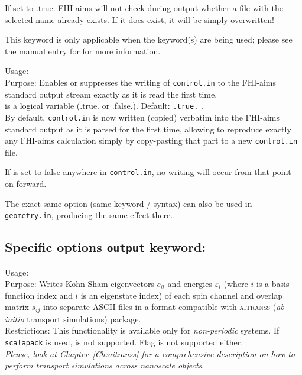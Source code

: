 If set to .true. FHI-aims will not check during output whether a file with the
selected name already exists. If it does exist, it will be simply overwritten!

This keyword is only applicable when the
  keyword(s) are being used; please see
the manual entry for   for more
information.

{
  \noindent
  Usage:   \\[1.0ex]
  Purpose: Enables or suppresses the writing of \texttt{control.in} to
  the FHI-aims standard output stream exactly as it is read the first
  time. \\[1.0ex]
   is a logical variable (.true. or .false.). Default: \texttt{.true.} . \\
}
By default, \texttt{control.in} is now written (copied) verbatim into
the FHI-aims standard output as it is parsed for the first time,
allowing to reproduce exactly any FHI-aims calculation simply by
copy-pasting that part to a new \texttt{control.in} file.

If  is set to false anywhere in
\texttt{control.in}, no writing will occur from that point on
forward.

The exact same option (same keyword / syntax) can also be used in
\texttt{geometry.in}, producing the same effect there.

\newpage

\subsection*{Specific options \texttt{output} keyword:}

{
  \noindent
  Usage:   \\[1.0ex]
  Purpose: Writes Kohn-Sham eigenvectors $c_{il}$ and energies $\varepsilon_l$
    (where $i$ is a basis function index and $l$ is an eigenstate index) of each
    spin channel and overlap matrix $s_{ij}$ into separate ASCII-files in a
    format compatible with \textsc{aitranss} (\textit{ab initio} transport
    simulations) package. \\[1.0ex]
  Restrictions: This functionality is available only for
    \emph{non-periodic} systems. If  \texttt{scalapack} is
    used,  is not supported. Flag
     is not supported either.\\
}
\emph{Please, look at Chapter~\ref{Ch:aitranss} for
  a comprehensive description on how to perform transport simulations across
  nanoscale objects}. \\


